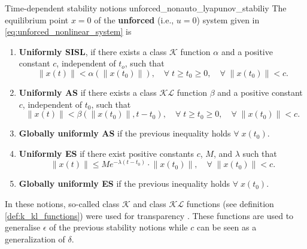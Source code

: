 \begin{definition}[list text=Time-dependent stability notions,after pre=\footnotetext{Definition 4.2 of \cite{khalilNonlinearControl2015} was slightly changed for consistency with earlier stability notions.}]{Time-dependent stability notions \cite{khalilNonlinearControl2015}\footnotemark}{unforced_nonauto_lyapunov_stabiliy}
  The equilibrium point $x = 0$ of the \textbf{unforced} (i.e., $u=0$) system given in \eqref{eq:unforced_nonlinear_system} is
  \begin{enumerate}
    \item \textbf{Uniformly SISL}, if there exists a class $\mathcal{K}$ function $\alpha$ and a positive constant $c$, independent of $t_o$, such that
          \begin{equation}
            \left\|x\left(t\right)\right\| < \alpha \left( \left\|x \left( t_0 \right) \right\|\right), \quad \forall \; t \geq t_0 \geq 0, \quad \forall \; \left\|x\left(t_0 \right) \right\| < c.
          \end{equation}
    \item \textbf{Uniformly AS} if there exists a class $\mathcal{KL}$ function $\beta$ and a positive constant $c$, independent of $t_0$, such that
          \begin{equation}
            \left\|x\left(t\right)\right\| < \beta \left( \left\|x \left( t_0 \right) \right\|, t-t_0\right), \quad \forall \; t \geq t_0 \geq 0, \quad \forall \; \left\|x\left(t_0 \right) \right\| < c.
          \end{equation}
    \item	\textbf{Globally uniformly AS} if the previous inequality holds $\forall \; x \left( t _ 0 \right)$.
    \item	\textbf{Uniformly ES} if there exist positive constants $c$, $M$, and $\lambda$ such that
          \begin{equation}
            \left\|x\left(t \right) \right\| \leq Me^{-\lambda\left(t-t_0\right)} \cdot \left\|x\left(t_0 \right) \right\|, \quad \forall \; \left\|x\left(t_0 \right) \right\| < c.
          \end{equation}
    \item \textbf{Globally uniformly ES} if the previous inequality holds $\forall \; x \left( t _ 0 \right)$.
  \end{enumerate}
\end{definition}
In these notions, so-called class $\mathcal{K}$ and class $\mathcal{KL}$ functions (see definition \ref{def:k_kl_functions}) were used for transparency \cite{khalilNonlinearSystems2002}. These functions are used to generalise $\epsilon$ of the previous stability notions while $c$ can be seen as a generalization of $\delta$.

